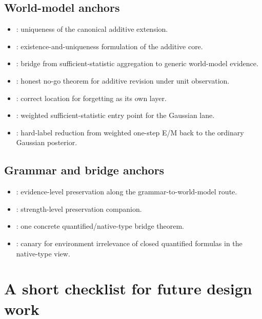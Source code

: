 \documentclass[11pt]{article}
\begin{document}
\subsection{World-model anchors}

\begin{itemize}
  \item {}: uniqueness of the canonical additive extension.
  \item {}: existence-and-uniqueness formulation of the additive core.
  \item {}: bridge from sufficient-statistic aggregation to generic world-model evidence.
  \item {}: honest no-go theorem for additive revision under unit observation.
  \item {}: correct location for forgetting as its own layer.
  \item {}: weighted sufficient-statistic entry point for the Gaussian lane.
  \item {}: hard-label reduction from weighted one-step E/M back to the ordinary Gaussian posterior.
\end{itemize}

\subsection{Grammar and bridge anchors}

\begin{itemize}
  \item {}: evidence-level preservation along the grammar-to-world-model route.
  \item {}: strength-level preservation companion.
  \item {}: one concrete quantified/native-type bridge theorem.
  \item {}: canary for environment irrelevance of closed quantified formulas in the native-type view.
\end{itemize}

\section{A short checklist for future design work}
\end{document}
